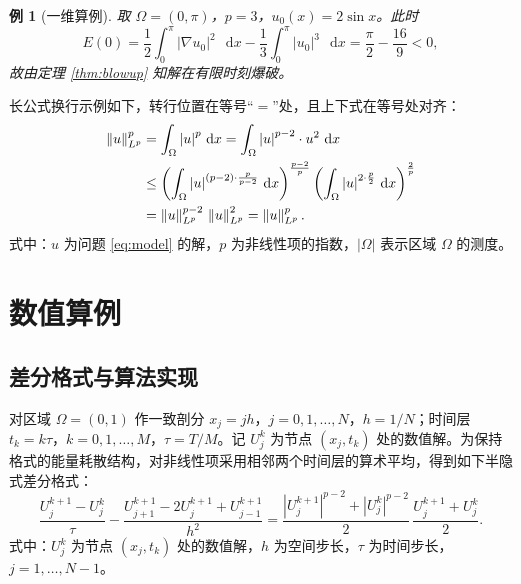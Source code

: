 \documentclass[12pt,a4paper,twoside,openright]{ctexbook}
\numberwithin{figure}{chapter}
\numberwithin{table}{chapter}
\numberwithin{equation}{chapter}
\theoremstyle{ncwuthm}
\newtheorem{example}{例}[chapter]
\newcommand{\dif}{\mathop{}\!\mathrm{d}}
\newcommand{\norm}[1]{\left\lVert #1 \right\rVert}
\newcommand{\abs}[1]{\left\lvert #1 \right\rvert}
\begin{document}
\begin{example}[一维算例]
取 $\Omega=(0,\pi)$，$p=3$，$u_0(x)=2\sin x$。此时
\begin{equation}
  E(0) = \frac12\int_0^\pi \abs{\nabla u_0}^2\,\dif x - \frac13\int_0^\pi \abs{u_0}^3\,\dif x
       = \frac{\pi}{2} - \frac{16}{9} < 0 ,
  \label{eq:ex1}
\end{equation}
故由定理 \ref{thm:blowup} 知解在有限时刻爆破。
\end{example}

长公式换行示例如下，转行位置在等号“$=$”处，且上下式在等号处对齐：
\begin{align}
  \norm{u}_{L^p}^p
  &= \int_\Omega \abs{u}^p \,\dif x
   = \int_\Omega \abs{u}^{p-2}\cdot u^2 \,\dif x \notag\\
  &\leq \left( \int_\Omega \abs{u}^{(p-2)\cdot\frac{p}{p-2}} \,\dif x \right)^{\frac{p-2}{p}}
     \left( \int_\Omega \abs{u}^{2\cdot\frac{p}{2}} \,\dif x \right)^{\frac{2}{p}} \notag\\
  &= \norm{u}_{L^p}^{p-2}\,\norm{u}_{L^p}^2
   = \norm{u}_{L^p}^p .
  \label{eq:holder}
\end{align}
式中：$u$ 为问题 \eqref{eq:model} 的解，$p$ 为非线性项的指数，$\abs{\Omega}$ 表示区域 $\Omega$ 的测度。

\chapter{数值算例}
\label{chap:num}
\section{差分格式与算法实现}
对区域 $\Omega=(0,1)$ 作一致剖分 $x_j=jh$，$j=0,1,\dots,N$，$h=1/N$；时间层 $t_k=k\tau$，$k=0,1,\dots,M$，$\tau=T/M$。记 $U_j^k$ 为节点 $(x_j,t_k)$ 处的数值解。为保持格式的能量耗散结构，对非线性项采用相邻两个时间层的算术平均，得到如下半隐式差分格式：
\begin{equation}
  \frac{U_j^{k+1}-U_j^k}{\tau}
  - \frac{U_{j+1}^{k+1}-2U_j^{k+1}+U_{j-1}^{k+1}}{h^2}
  = \frac{\abs{U_j^{k+1}}^{p-2} + \abs{U_j^{k}}^{p-2}}{2}\,
    \frac{U_j^{k+1}+U_j^k}{2} .
  \label{eq:scheme}
\end{equation}
式中：$U_j^k$ 为节点 $(x_j,t_k)$ 处的数值解，$h$ 为空间步长，$\tau$ 为时间步长，$j=1,\dots,N-1$。
\end{document}
